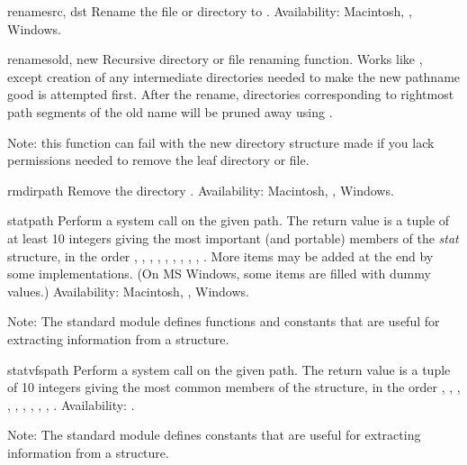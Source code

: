 \begin{funcdesc}{rename}{src, dst}
Rename the file or directory  to .
Availability: Macintosh, \UNIX{}, Windows.
\end{funcdesc}

\begin{funcdesc}{renames}{old, new}
Recursive directory or file renaming function.
Works like , except creation of any intermediate
directories needed to make the new pathname good is attempted first.
After the rename, directories corresponding to rightmost path segments
of the old name will be pruned away using .

Note: this function can fail with the new directory structure made if
you lack permissions needed to remove the leaf directory or file.
\end{funcdesc}

\begin{funcdesc}{rmdir}{path}
Remove the directory .
Availability: Macintosh, \UNIX{}, Windows.
\end{funcdesc}

\begin{funcdesc}{stat}{path}
Perform a  system call on the given path.  The
return value is a tuple of at least 10 integers giving the most
important (and portable) members of the \emph{stat} structure, in the
order
,
,
,
,
,
,
,
,
,
.
More items may be added at the end by some implementations.
(On MS Windows, some items are filled with dummy values.)
Availability: Macintosh, \UNIX{}, Windows.

Note: The standard module  defines
functions and constants that are useful for extracting information
from a  structure.
\end{funcdesc}

\begin{funcdesc}{statvfs}{path}
Perform a  system call on the given path.  The
return value is a tuple of 10 integers giving the most common
members of the  structure, in the order
,
,
,
,
,
,
,
,
,
.
Availability: \UNIX{}.

Note: The standard module 
defines constants that are useful for extracting information
from a  structure.
\end{funcdesc}

